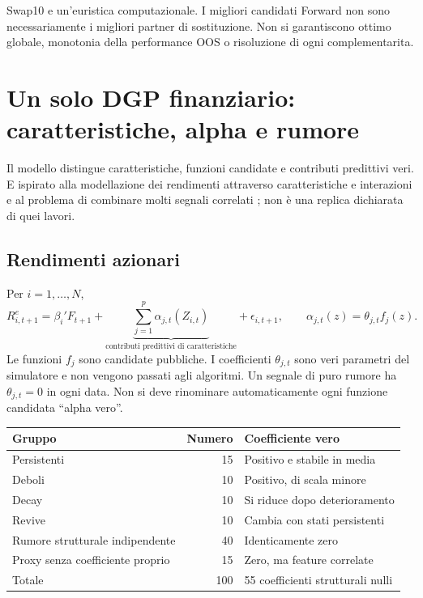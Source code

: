 \documentclass[11pt,a4paper]{article}
\theoremstyle{definition}\newtheorem{definition}[theorem]{Definizione}
\theoremstyle{remark}\newtheorem{remark}[theorem]{Osservazione}
\begin{document}
Swap10 e un'euristica computazionale. I migliori candidati Forward non sono necessariamente i migliori partner di sostituzione. Non si garantiscono ottimo globale, monotonia della performance OOS o risoluzione di ogni complementarita.

\section{Un solo DGP finanziario: caratteristiche, alpha e rumore}
\label{sec:dgp}
Il modello distingue caratteristiche, funzioni candidate e contributi predittivi veri. E ispirato alla modellazione dei rendimenti attraverso caratteristiche e interazioni \cite{gkx} e al problema di combinare molti segnali correlati \cite{kns}; non è una replica dichiarata di quei lavori.

\subsection{Rendimenti azionari}
Per $i=1,\ldots,N$,
\begin{equation}
 R^e_{i,t+1}=\beta_i'F_{t+1}
   +\underbrace{\sum_{j=1}^{p}\alpha_{j,t}(Z_{i,t})}_{\text{contributi predittivi di caratteristiche}}
   +\epsilon_{i,t+1},\qquad
 \alpha_{j,t}(z)=\theta_{j,t}f_j(z).\label{eq:dgp}
\end{equation}
Le funzioni $f_j$ sono candidate pubbliche. I coefficienti $\theta_{j,t}$ sono veri parametri del simulatore e non vengono passati agli algoritmi. Un segnale di puro rumore ha $\theta_{j,t}=0$ in ogni data. Non si deve rinominare automaticamente ogni funzione candidata ``alpha vero''.

\begin{longtable}{p{.46\linewidth}rp{.32\linewidth}}
\toprule Gruppo & Numero & Coefficiente vero\\\midrule\endhead
Persistenti & 15 & Positivo e stabile in media\\
Deboli & 10 & Positivo, di scala minore\\
Decay & 10 & Si riduce dopo deterioramento\\
Revive & 10 & Cambia con stati persistenti\\
Rumore strutturale indipendente & 40 & Identicamente zero\\
Proxy senza coefficiente proprio & 15 & Zero, ma feature correlate\\\midrule
Totale & 100 & 55 coefficienti strutturali nulli\\\bottomrule
\end{longtable}
\end{document}
